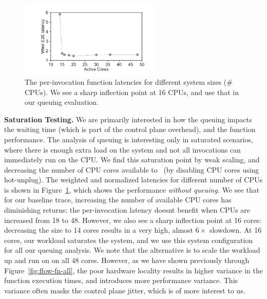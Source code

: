 \begin{figure}
  \centering 
  \includegraphics[width=0.6\textwidth]{iluvatar/graphs/scaling/WeakScaling.pdf}
  \caption{The per-invocation function latencies for different system sizes (\# CPUs). We see a sharp inflection point at 16 CPUs, and use that in our queuing evaluation.}
  \label{fig:weak}
\end{figure}


\noindent \textbf{Saturation Testing.}
We are primarily interested in how the queuing impacts the waiting time (which is part of the control plane overhead), and the function performance.
The analysis of queuing is interesting only in saturated scenarios, where there is enough extra load on the system and not all invocations can immediately run on the CPU.
We find this saturation point by weak scaling, and decreasing the number of CPU cores available to \sysname~(by disabling CPU cores using hot-unplug). 
The weighted and normalized latencies for different number of CPUs is shown in Figure~\ref{fig:weak}, which shows the performance \emph{without queuing.}
We see that for our baseline trace, increasing the number of available CPU cores has diminishing returns: the per-invocation latency doesnt benefit when CPUs are increased from 18 to 48.
However, we also see a sharp inflection point at 16 cores: decreasing the size to 14 cores results in a very high, almost $6\times$ slowdown. 
At 16 cores, our workload saturates the system, and we use this system configuration for all our queuing analysis.
We note that the alternative is to scale the workload up and run on on all 48 cores.
However, as we have shown previously through Figure~\ref{fig:flow-fn-all}, the poor hardware locality results in higher variance in the function execution times, and introduces more performance variance.
This variance often masks the control plane jitter, which is of more interest to us. 

